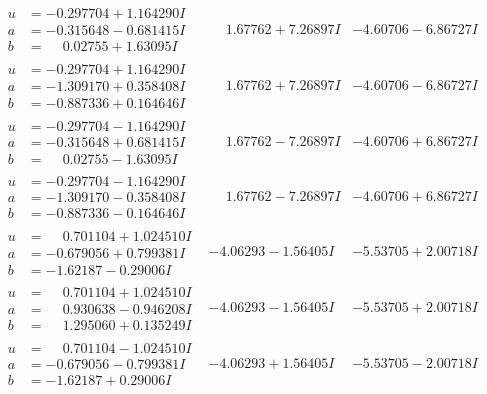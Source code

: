 \documentclass[1p]{elsarticle_modified}
\theoremstyle{definition}
\begin{document}
$$\begin{array}{c|c|c}
\begin{aligned}
u &= -0.297704 + 1.164290 I \\
a &= -0.315648 - 0.681415 I \\
b &= \phantom{-}0.02755 + 1.63095 I\end{aligned}
 & \phantom{-}1.67762 + 7.26897 I & -4.60706 - 6.86727 I \\ \hline\begin{aligned}
u &= -0.297704 + 1.164290 I \\
a &= -1.309170 + 0.358408 I \\
b &= -0.887336 + 0.164646 I\end{aligned}
 & \phantom{-}1.67762 + 7.26897 I & -4.60706 - 6.86727 I \\ \hline\begin{aligned}
u &= -0.297704 - 1.164290 I \\
a &= -0.315648 + 0.681415 I \\
b &= \phantom{-}0.02755 - 1.63095 I\end{aligned}
 & \phantom{-}1.67762 - 7.26897 I & -4.60706 + 6.86727 I \\ \hline\begin{aligned}
u &= -0.297704 - 1.164290 I \\
a &= -1.309170 - 0.358408 I \\
b &= -0.887336 - 0.164646 I\end{aligned}
 & \phantom{-}1.67762 - 7.26897 I & -4.60706 + 6.86727 I \\ \hline\begin{aligned}
u &= \phantom{-}0.701104 + 1.024510 I \\
a &= -0.679056 + 0.799381 I \\
b &= -1.62187 - 0.29006 I\end{aligned}
 & -4.06293 - 1.56405 I & -5.53705 + 2.00718 I \\ \hline\begin{aligned}
u &= \phantom{-}0.701104 + 1.024510 I \\
a &= \phantom{-}0.930638 - 0.946208 I \\
b &= \phantom{-}1.295060 + 0.135249 I\end{aligned}
 & -4.06293 - 1.56405 I & -5.53705 + 2.00718 I \\ \hline\begin{aligned}
u &= \phantom{-}0.701104 - 1.024510 I \\
a &= -0.679056 - 0.799381 I \\
b &= -1.62187 + 0.29006 I\end{aligned}
 & -4.06293 + 1.56405 I & -5.53705 - 2.00718 I \\ \hline\begin{aligned}

\end{aligned}
\end{array}$$
\end{document}
